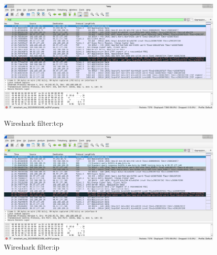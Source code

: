 \begin{figure}[!htp]
    \centering
    \begin{minipage}{.49\textwidth}
        \centering
        \includegraphics[width=.99\textwidth]
        {../_INCLUDES/main/task4/4-1-filter-tcp.png}
        \caption{Wireshark filter:tcp}
        \label{fig:4-1-filter-tcp}
    \end{minipage}
    \begin{minipage}{.49\textwidth}
        \centering
        \includegraphics[width=.99\textwidth]
        {../_INCLUDES/main/task4/4-1-filter-ip.png}
        \caption{Wireshark filter:ip}
        \label{fig:4-1-filter-ip}
    \end{minipage}
\end{figure}

